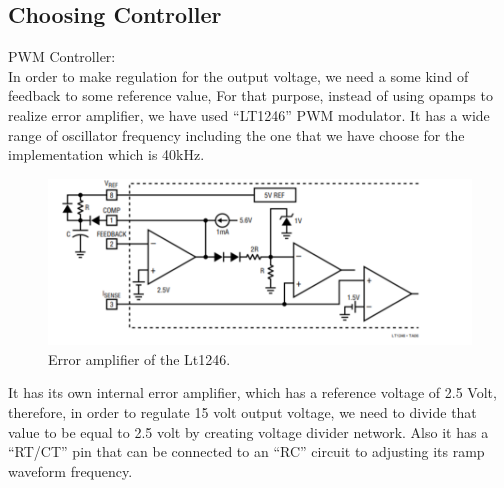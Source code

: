 \documentclass{article}
\begin{document}
\subsection{Choosing Controller}
PWM Controller:\\
In order to make regulation for the output voltage, we need a some kind of feedback to some reference value, For that purpose, instead of using opamps to realize error amplifier, we have used “LT1246” PWM modulator. It has a wide range of oscillator frequency including the one that we have choose for the implementation which is 40kHz.
\begin{figure}[H]
    \centering
    \includegraphics{IC.png}
    \caption{Error amplifier of the Lt1246.}
    \label{fig:my_label}
\end{figure}

It has its own internal error amplifier, which has a reference voltage of 2.5 Volt, therefore, in order to regulate 15 volt output voltage, we need to divide that value to be equal to 2.5 volt by creating voltage divider network. Also it has a “RT/CT” pin that can be connected to an “RC” circuit to adjusting its ramp waveform frequency.
\end{document}
